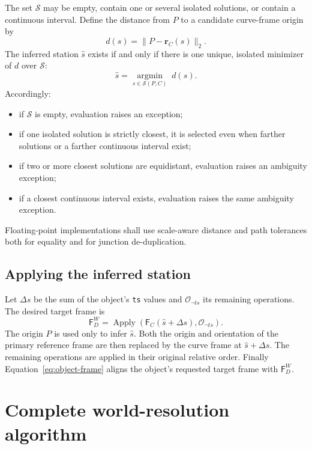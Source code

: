 \documentclass[11pt,a4paper]{article}
\newcommand{\Frame}{\mathsf{F}}
\newcommand{\Apply}{\operatorname{Apply}}
\newcommand{\ops}{\mathcal{O}}
\begin{document}
The set $\mathcal{S}$ may be empty, contain one or several isolated solutions,
or contain a continuous interval.  Define the distance from $P$ to a candidate
curve-frame origin by
\begin{equation}
  d(s)=\lVert P-\mathbf{r}_C(s)\rVert_2.
\end{equation}
The inferred station $\widehat{s}$ exists if and only if there is one unique,
isolated minimizer of $d$ over $\mathcal{S}$:
\begin{equation}
  \widehat{s}
  =\underset{s\in\mathcal{S}(P,C)}{\operatorname{argmin}}\;d(s).
  \label{eq:closest-station}
\end{equation}
Accordingly:
\begin{itemize}
  \item if $\mathcal{S}$ is empty, evaluation raises an exception;
  \item if one isolated solution is strictly closest, it is selected even when
        farther solutions or a farther continuous interval exist;
  \item if two or more closest solutions are equidistant, evaluation raises an
        ambiguity exception;
  \item if a closest continuous interval exists, evaluation raises the same
        ambiguity exception.
\end{itemize}
Floating-point implementations shall use scale-aware distance and path
tolerances both for equality and for junction de-duplication.

\subsection{Applying the inferred station}

Let $\Delta s$ be the sum of the object's \texttt{ts} values and
$\ops_{\neg ts}$ its remaining operations.  The desired target frame is
\begin{equation}
  \boxed{
  \Frame_D^W
  =\Apply\!\left(\Frame_C(\widehat{s}+\Delta s),
                  \ops_{\neg ts}\right)}.
  \label{eq:inferred-position}
\end{equation}
The origin $P$ is used only to infer $\widehat{s}$.  Both the origin and
orientation of the primary reference frame are then replaced by the curve frame
at $\widehat{s}+\Delta s$.  The remaining operations are applied in their
original relative order.  Finally Equation~\eqref{eq:object-frame} aligns the
object's requested target frame with $\Frame_D^W$.

\section{Complete world-resolution algorithm}
\label{sec:resolution-algorithm}
\end{document}
